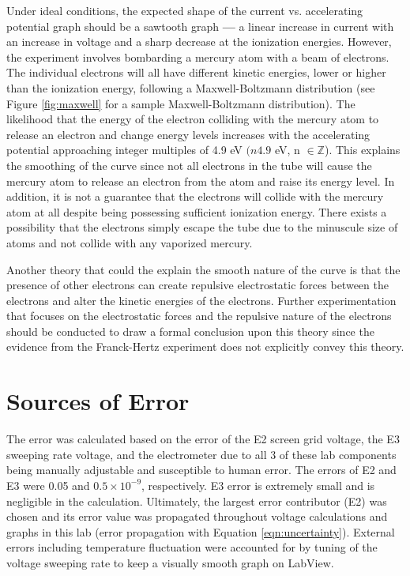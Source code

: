 \documentclass[12pt, letterpaper, twoside]{article}
\begin{document}
Under ideal conditions, the expected shape of the current vs. accelerating potential graph should be a sawtooth graph \textbf{---} a linear increase in current with an increase in voltage and a sharp decrease at the ionization energies. However, the experiment involves bombarding a mercury atom with a beam of electrons. The individual electrons will all have different kinetic energies, lower or higher than the ionization energy, following a Maxwell-Boltzmann distribution (see Figure \ref{fig:maxwell} for a sample Maxwell-Boltzmann distribution). The likelihood that the energy of the electron colliding with the mercury atom to release an electron and change energy levels increases with the accelerating potential approaching integer multiples of 4.9 eV $(n4.9$ eV, n $\in \mathbb{Z}$). This explains the smoothing of the curve since not all electrons in the tube will cause the mercury atom to release an electron from the atom and raise its energy level. In addition, it is not a guarantee that the electrons will collide with the mercury atom at all despite being possessing sufficient ionization energy. There exists a possibility that the electrons simply escape the tube due to the minuscule size of atoms and not collide with any vaporized mercury.

Another theory that could the explain the smooth nature of the curve is that the presence of other electrons can create repulsive electrostatic forces between the electrons and alter the kinetic energies of the electrons. Further experimentation that focuses on the electrostatic forces and the repulsive nature of the electrons should be conducted to draw a formal conclusion upon this theory since the evidence from the Franck-Hertz experiment does not explicitly convey this theory.

\section{Sources of Error}

The error was calculated based on the error of the E2 screen grid voltage, the E3 sweeping rate voltage, and the electrometer due to all 3 of these lab components being manually adjustable and susceptible to human error. The errors of E2 and E3 were 0.05 and $0.5 \times 10^{-9}$, respectively. E3 error is extremely small and is negligible in the calculation. Ultimately, the largest error contributor (E2) was chosen and its error value was propagated throughout voltage calculations and graphs in this lab (error propagation with Equation \ref{eqn:uncertainty}). External errors including temperature fluctuation were accounted for by tuning of the voltage sweeping rate to keep a visually smooth graph on LabView. 
\end{document}
